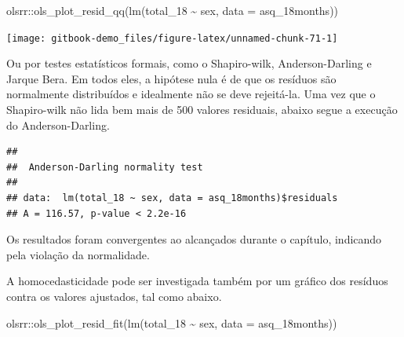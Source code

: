 \documentclass[
]{book}
\newenvironment{Shaded}{\begin{snugshade}}{\end{snugshade}}
\newcommand{\AttributeTok}[1]{\textcolor[rgb]{0.77,0.63,0.00}{#1}}
\newcommand{\FunctionTok}[1]{\textcolor[rgb]{0.00,0.00,0.00}{#1}}
\newcommand{\NormalTok}[1]{#1}
\newcommand{\SpecialCharTok}[1]{\textcolor[rgb]{0.00,0.00,0.00}{#1}}
\begin{document}
\begin{Shaded}
\begin{Highlighting}[]
\NormalTok{olsrr}\SpecialCharTok{::}\FunctionTok{ols\_plot\_resid\_qq}\NormalTok{(}\FunctionTok{lm}\NormalTok{(total\_18 }\SpecialCharTok{\textasciitilde{}}\NormalTok{ sex, }\AttributeTok{data =}\NormalTok{ asq\_18months))}
\end{Highlighting}
\end{Shaded}

\begin{center}\texttt{[image: gitbook-demo\_files/figure-latex/unnamed-chunk-71-1]} \end{center}

Ou por testes estatísticos formais, como o Shapiro-wilk, Anderson-Darling e Jarque Bera. Em todos eles, a hipótese nula é de que os resíduos são normalmente distribuídos e idealmente não se deve rejeitá-la. Uma vez que o Shapiro-wilk não lida bem mais de 500 valores residuais, abaixo segue a execução do Anderson-Darling.

\begin{Shaded}
\end{Shaded}

\begin{verbatim}
## 
##  Anderson-Darling normality test
## 
## data:  lm(total_18 ~ sex, data = asq_18months)$residuals
## A = 116.57, p-value < 2.2e-16
\end{verbatim}

Os resultados foram convergentes ao alcançados durante o capítulo, indicando pela violação da normalidade.

A homocedasticidade pode ser investigada também por um gráfico dos resíduos contra os valores ajustados, tal como abaixo.

\begin{Shaded}
\begin{Highlighting}[]
\NormalTok{olsrr}\SpecialCharTok{::}\FunctionTok{ols\_plot\_resid\_fit}\NormalTok{(}\FunctionTok{lm}\NormalTok{(total\_18 }\SpecialCharTok{\textasciitilde{}}\NormalTok{ sex, }\AttributeTok{data =}\NormalTok{ asq\_18months))}
\end{Highlighting}
\end{Shaded}
\end{document}
